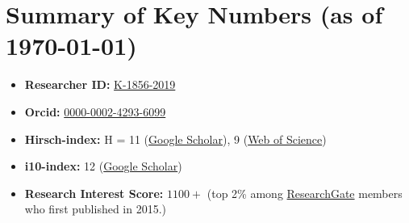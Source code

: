 \section{Summary of Key Numbers (as of \today)}
\begin{itemize}[leftmargin=1.5em]
\item \faIdCard\hspace{0.3em}\textbf{Researcher ID:} \href{https://www.webofscience.com/wos/author/record/K-1856-2019}{K-1856-2019}
\item \faOrcid\hspace{0.3em}\textbf{Orcid:} \href{https://orcid.org/0000-0002-4293-6099}{0000-0002-4293-6099}
\item \faChartLine\hspace{0.3em}\textbf{Hirsch-index:} H = 11 (\href{https://scholar.google.com/citations?hl=en&user=tHb_qZoAAAAJ}{Google Scholar}), 9 (\href{https://www.webofscience.com/wos/author/record/K-1856-2019}{Web of Science})
\item \faFile\hspace{0.3em}\textbf{i10-index:} 12 (\href{https://scholar.google.com/citations?hl=en&user=tHb_qZoAAAAJ}{Google Scholar})
\item \faUsers\hspace{0.3em}\textbf{Research Interest Score:} \(1100+\) (top 2\% among \href{https://www.researchgate.net/profile/Vatsal-Sanjay-2}{ResearchGate} members who first published in 2015.)
\end{itemize}



